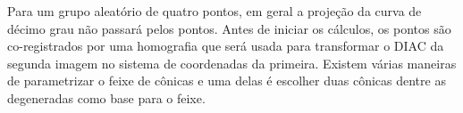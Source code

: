 Para um grupo aleatório de quatro pontos, em geral a projeção da curva de décimo grau não passará pelos pontos. Antes de iniciar os cálculos, os pontos são co-registrados por uma homografia que será usada para transformar o DIAC  da segunda imagem no sistema de coordenadas da primeira. Existem várias maneiras de parametrizar o feixe de cônicas e uma delas é escolher duas cônicas dentre as degeneradas como base para o feixe.


